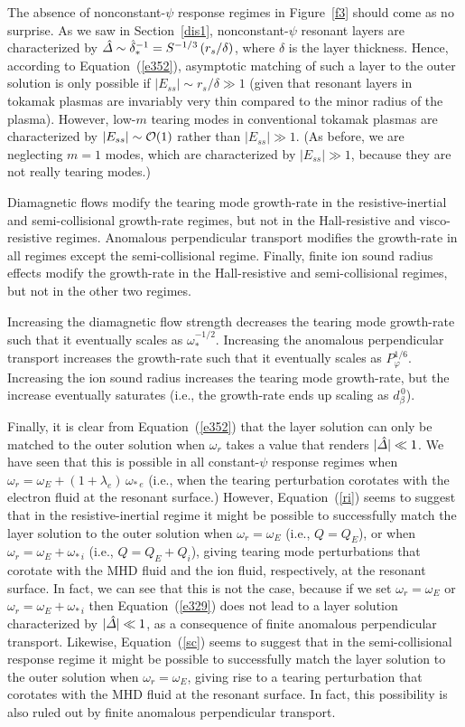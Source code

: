 \documentclass[notitlepage,12pt]{article}
\begin{document}
The absence of nonconstant-$\psi$ response regimes in Figure~\ref{f3}
should come as no surprise. As we saw in Section~\ref{dis1}, nonconstant-$\psi$ resonant layers
are characterized by $\hat{\mit\Delta}\sim\hat{\delta}_\ast^{-1}= S^{-1/3}\,(r_s/\delta)$, where $\delta$
is the layer thickness. Hence, according to Equation~(\ref{e352}), asymptotic matching of such a
layer to the outer solution is only possible if $|E_{ss}|\sim r_s/\delta \gg 1$ (given that resonant
layers in tokamak plasmas are invariably very thin compared to the minor radius of the plasma). However,
low-$m$ tearing modes in conventional tokamak plasmas are characterized by $|E_{ss}|\sim {\cal O}(1)$ rather than
$|E_{ss}|\gg 1$. (As before, we are neglecting $m=1$ modes, which are characterized by
$|E_{ss}|\gg 1$, because they are not really tearing modes.)

Diamagnetic flows modify the tearing mode growth-rate in the resistive-inertial and semi-collisional
growth-rate regimes, but not in the Hall-resistive and visco-resistive regimes. Anomalous perpendicular
transport modifies the growth-rate in all regimes except the semi-collisional regime. Finally, finite ion sound radius 
effects modify the growth-rate in the Hall-resistive and semi-collisional regimes, but not in the other two
regimes. 

Increasing  the diamagnetic flow strength decreases the tearing mode growth-rate such that it
eventually scales as $\omega_\ast^{-1/2}$. Increasing the anomalous perpendicular transport increases the
growth-rate such that it  eventually scales as $P_\varphi^{1/6}$. Increasing the ion sound radius 
increases the tearing mode growth-rate, but the increase eventually saturates (i.e., the
growth-rate ends up scaling as $d_\beta^{\,0}$). 

Finally, it is clear from Equation~(\ref{e352}) that the layer solution can only be matched to the
outer solution when $\omega_r$ takes a value that renders $|\hat{\mit\Delta}|\ll 1$. We have seen that this
is possible in all constant-$\psi$ response regimes when $\omega_r= \omega_E+(1+\lambda_e)\,\omega_{\ast\,e}$
(i.e., when the tearing perturbation corotates with the electron fluid at the resonant surface.) However, Equation~(\ref{ri})
seems to suggest that in the resistive-inertial regime it might be possible to successfully match the
layer solution to the outer solution when $\omega_r=\omega_E$ (i.e., $Q=Q_E$), or when 
$\omega_r=\omega_E+\omega_{\ast\,i}$
(i.e., $Q=Q_E+Q_i$),
giving tearing mode perturbations that corotate with the MHD fluid and the ion fluid, respectively, at the resonant
surface. In fact, we can see that this is not the case, because if we set $\omega_r=\omega_E$ or $\omega_r=\omega_E+\omega_{\ast\,i}$  then Equation~(\ref{e329}) does not lead to a layer solution characterized by  $|\hat{\mit\Delta}|\ll 1$, 
as a consequence of finite anomalous perpendicular transport. Likewise, Equation~(\ref{sc}) seems to suggest that in the semi-collisional response regime it might be possible to successfully match the
layer solution to the outer solution when $\omega_r=\omega_E$, giving rise to a tearing perturbation that corotates with the MHD fluid at the resonant surface.  In fact, this possibility is also ruled out by finite anomalous
perpendicular transport. 
\end{document}
